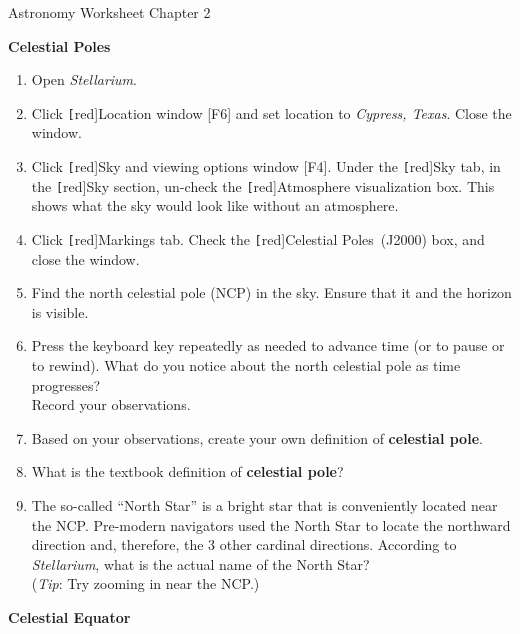 \documentclass{article}
\newcounter{mycounter}
\begin{document}
\clearpage

Astronomy \hfill Worksheet \themycounter \hfill Chapter 2
\vspace{1em}

\textbf{Celestial Poles}
\vspace{-1em}

\begin{enumerate}
\setlength\itemsep{0pt}
    \item Open \textit{Stellarium}.
    \item Click \texttt[red]{Location window [F6]} and set location to \textit{Cypress, Texas}. Close the window.
    \item Click \texttt[red]{Sky and viewing options window [F4]}. Under the \texttt[red]{Sky} tab, in the \texttt[red]{Sky} section, un-check the \texttt[red]{Atmosphere visualization} box. This shows what the sky would look like without an atmosphere. 
    \item Click \texttt[red]{Markings} tab. Check the \texttt[red]{Celestial Poles~(J2000)} box, and close the window.
    \item Find the north celestial pole (NCP) in the sky. Ensure that it and the horizon is visible.
    \item Press the keyboard  key repeatedly as needed to advance time (or  to pause or  to rewind). What do you notice about the north celestial pole as time progresses? \\Record your observations.
    \item Based on your observations, create your own definition of \textbf{celestial pole}.
    \item What is the textbook definition of \textbf{celestial pole}?
    \item The so-called ``North Star'' is a bright star that is conveniently located near the NCP. Pre-modern navigators used  the North Star to locate the northward direction and, therefore, the 3 other cardinal directions. According to \textit{Stellarium}, what is the actual name of the North Star? \\(\textit{Tip}: Try zooming in near the NCP.)
\end{enumerate}

\textbf{Celestial Equator}
\vspace{-1em}
\end{document}

